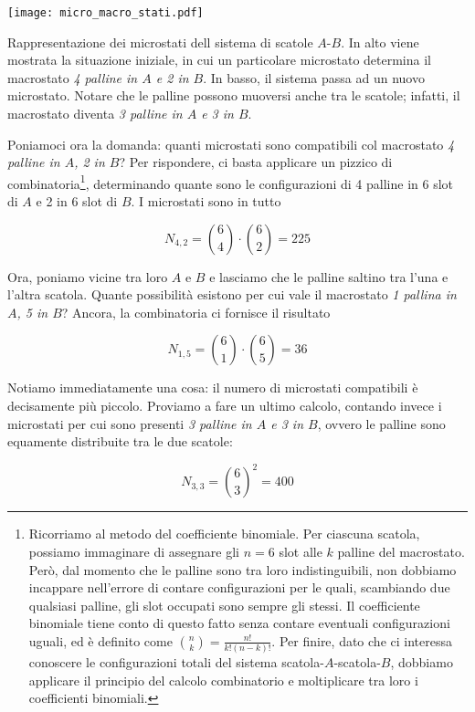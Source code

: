 \begin{marginfigure}
    \centering
    \texttt{[image: micro\_macro\_stati.pdf]}
    \caption{Rappresentazione dei microstati dell sistema di scatole
    $A$-$B$. In alto viene mostrata la situazione iniziale, in cui
    un particolare microstato determina il macrostato \textit{4 palline
    in $A$ e 2 in $B$}. In basso, il sistema passa ad un nuovo microstato.
    Notare che le palline possono muoversi anche tra le scatole; infatti,
    il macrostato diventa \textit{3 palline in $A$ e 3 in $B$}.}
    \label{micromacro}
\end{marginfigure}

Poniamoci ora la domanda: quanti microstati sono compatibili
col macrostato \textit{4 palline in $A$, 2 in $B$}? Per rispondere,
ci basta applicare un pizzico di combinatoria\footnote{Ricorriamo
al metodo del coefficiente binomiale. Per ciascuna scatola, possiamo immaginare
di assegnare gli $n = 6$ slot alle $k$ palline del macrostato. Però, dal
momento che le palline sono tra loro indistinguibili, non dobbiamo incappare
nell'errore di contare configurazioni per le quali, scambiando due qualsiasi
palline, gli slot occupati sono sempre gli stessi. Il coefficiente binomiale
tiene conto di questo fatto senza contare eventuali configurazioni uguali,
ed è definito come $\binom{n}{k} = \frac{n!}{k!(n - k)!}$. Per finire, dato
che ci interessa conoscere le configurazioni totali del sistema scatola-$A$-scatola-$B$,
dobbiamo applicare il principio del calcolo combinatorio e moltiplicare tra
loro i coefficienti binomiali.},
determinando quante sono le configurazioni di 4 palline in 6 slot di $A$
e 2 in 6 slot di $B$. I microstati sono in tutto

\[ N_{4,2} = \binom{6}{4} \cdot \binom{6}{2} = 225 \]

Ora, poniamo vicine tra loro $A$ e $B$ e lasciamo che le palline
saltino tra l'una e l'altra scatola. Quante possibilità esistono
per cui vale il macrostato \textit{1 pallina in $A$, 5 in $B$}?
Ancora, la combinatoria ci fornisce il risultato

\[ N_{1,5} = \binom{6}{1} \cdot \binom{6}{5} = 36 \]

\noindent Notiamo immediatamente una cosa: il numero di microstati
compatibili è decisamente più piccolo. Proviamo a fare un ultimo
calcolo, contando invece i microstati per cui sono presenti
\textit{3 palline in $A$ e 3 in $B$}, ovvero le palline sono
equamente distribuite tra le due scatole:

\[ N_{3,3} =\binom{6}{3}^2 = 400 \]

